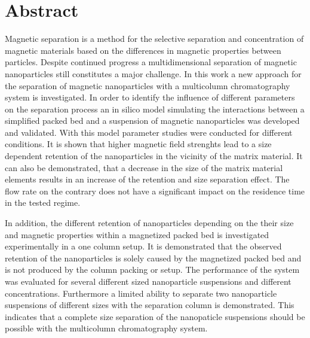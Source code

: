 \chapter{Abstract}
\label{ch:abstract_en}

Magnetic separation is a method for the selective separation and concentration of magnetic materials based on the differences in magnetic properties between particles. Despite continued progress a multidimensional separation of magnetic nanoparticles still constitutes a major challenge. In this work a new approach for the separation of magnetic nanoparticles with a multicolumn chromatography system is investigated. In order to identify the influence of different parameters on the separation process an in silico model simulating the interactions between a simplified packed bed and a suspension of magnetic nanoparticles was developed and validated. With this model parameter studies were conducted for different conditions. It is shown that higher magnetic field strenghts lead to a size dependent retention of the nanoparticles in the vicinity of the matrix material. It can also be demonstrated, that a decrease in the size of the matrix material elements results in an increase of the retention and size separation effect. The flow rate on the contrary does not have a significant impact on the residence time in the tested regime.  

In addition, the different retention of nanoparticles depending on the their size and magnetic properties within a magnetized packed bed is investigated experimentally in a one column setup. It is demonstrated that the observed retention of the nanoparticles is solely caused by the magnetized packed bed and is not produced by the column packing or setup. The performance of the system was evaluated for several different sized nanoparticle suspensions and different concentrations. Furthermore a limited ability to separate two nanoparticle suspensions of different sizes with the separation column is demonstrated. This indicates that a complete size separation of the nanopaticle suspensions should be possible with the multicolumn chromatography system. 